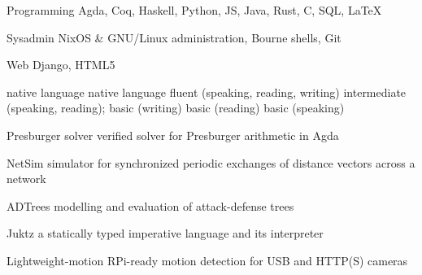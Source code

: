 \documentclass[11pt, a4paper]{awesome-cv}
\begin{document}
\noindent
\begin{minipage}[t]{0.55\linewidth}
\vspace{0.21\baselineskip}
\begin{cvskills}
    \cvskill
      {Programming} %
      {Agda, Coq, Haskell, Python, JS, Java, Rust, C, SQL, LaTeX} %
  
    \cvskill
      {Sysadmin} %
      {NixOS \& GNU/Linux administration, Bourne shells, Git} %
  
    \cvskill
      {Web} %
      {Django, HTML5} %
\end{cvskills}
\end{minipage}%
\hspace{0.05\linewidth}
\begin{minipage}[t]{0.4\linewidth}
\begin{cvskills}
     {native language}
     {native language}
     {fluent (speaking, reading, writing)}
     {
        intermediate (speaking, reading);\newline
        basic (writing)}
     {basic (reading)}
     {basic (speaking)}
\end{cvskills}
\end{minipage}


\begin{cvskills}
    \cvskill
        {Presburger solver}
        {verified solver for Presburger arithmetic in Agda}

    \cvskill
        {NetSim}
        {simulator for synchronized periodic exchanges of distance vectors
        across a network}

    \cvskill
        {ADTrees}
        {modelling and evaluation of attack-defense trees}

    \cvskill
        {Juktz}
        {a statically typed imperative language and its interpreter}

    \cvskill
        {Lightweight-motion}
        {RPi-ready motion detection for USB and HTTP(S) cameras}
\end{cvskills}

\end{document}
